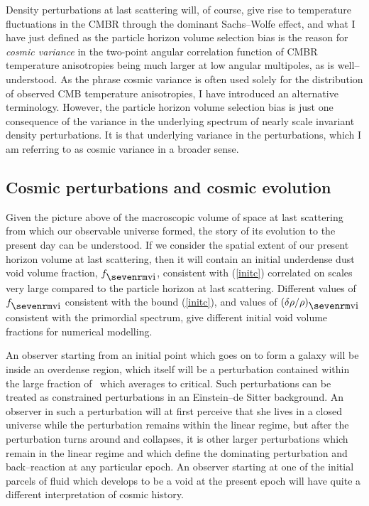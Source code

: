 \documentclass[12pt]{article}
\begin{document}
Density perturbations at last scattering will, of course, give rise
to temperature fluctuations in the CMBR through the dominant Sachs--Wolfe
effect, and what I have just defined as the particle horizon volume selection
bias is the reason for {\em cosmic variance} in the two-point angular
correlation function of CMBR temperature anisotropies \cite{LL} being much
larger at low angular multipoles, as is well--understood. As the phrase
cosmic variance is often used solely for the distribution of
observed CMB temperature anisotropies, I have introduced an alternative
terminology. However, the particle horizon volume selection bias is just
one consequence of the variance in the underlying spectrum of nearly
scale invariant density perturbations. It is that underlying variance
in the perturbations, which I am referring to as cosmic variance in a
broader sense.

\subsection{Cosmic perturbations and cosmic evolution\label{structure}}

Given the picture above of the macroscopic volume of space at last scattering
from which our observable universe formed, the story of its evolution to
the present day can be understood. If we consider the spatial extent of
our present horizon volume at last scattering, then it will contain an
initial underdense dust void volume fraction, $\fvi$, consistent with
(\ref{initc}) correlated on scales very large compared to the particle
horizon at last scattering. Different values of $\fvi$ consistent with
the bound (\ref{initc}), and values of $(\de\rh/\rh)\ns{vi}$ consistent
with the primordial spectrum, give different initial void volume fractions
for numerical modelling.

An observer starting from an initial point which goes on to form a galaxy
will be inside an overdense region, which itself will be a perturbation
contained within the large fraction of \SS\ which averages to critical.
Such perturbations can be treated as constrained perturbations in an
Einstein--de Sitter background. An observer in such a perturbation
will at first perceive that she lives in a closed universe while the
perturbation remains within the linear regime, but after the perturbation
turns around and collapses, it is other larger perturbations which remain
in the linear regime and which define the dominating perturbation and
back--reaction at any particular epoch. An observer starting at one of
the initial parcels of fluid which develops to be a void at the present
epoch will have quite a different interpretation of cosmic history.
\end{document}
